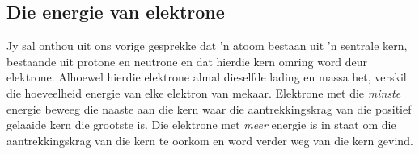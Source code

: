 \subsection*{Die energie van elektrone}
\nopagebreak
\label{m38741*id259210}
Jy sal onthou uit ons vorige gesprekke dat 'n atoom bestaan uit 'n sentrale kern, bestaande uit protone en neutrone en dat hierdie kern omring word deur elektrone. Alhoewel hierdie elektrone almal dieselfde lading en massa het, verskil die hoeveelheid energie van elke elektron van mekaar. Elektrone met die \textsl{minste} energie beweeg die naaste aan die kern waar die aantrekkingskrag van die positief gelaaide kern die grootste is. Die elektrone met \textsl{meer} energie is in staat om die aantrekkingskrag van die kern te oorkom en word verder weg van die kern gevind.\par 


      
